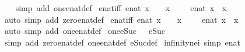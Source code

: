 \begin{isabellebody}
%
\isadelimproof
\ \ %
\endisadelimproof
%
\isatagproof
{}\isamarkupfalse%
\ {\isacharparenleft}simp\ add{\isacharcolon}\ one{\isacharunderscore}enat{\isacharunderscore}def{\isacharparenright}%
\endisatagproof
{\isafoldproof}%
%
\isadelimproof
\isanewline
%
\endisadelimproof
\isanewline
{}\isamarkupfalse%
\ enat{\isacharunderscore}{}{\isacharunderscore}iff{\isacharcolon}\ {\isachardoublequoteopen}enat\ x\ {\isacharequal}\ {}\ {\isasymlongleftrightarrow}\ x\ {\isacharequal}\ {}{\isachardoublequoteclose}\ {\isachardoublequoteopen}{}\ {\isacharequal}\ enat\ x\ {\isasymlongleftrightarrow}\ x\ {\isacharequal}\ {}{\isachardoublequoteclose}\isanewline
%
\isadelimproof
\ \ %
\endisadelimproof
%
\isatagproof
{}\isamarkupfalse%
\ {\isacharparenleft}auto\ simp\ add{\isacharcolon}\ zero{\isacharunderscore}enat{\isacharunderscore}def{\isacharparenright}%
\endisatagproof
{\isafoldproof}%
%
\isadelimproof
\isanewline
%
\endisadelimproof
\isanewline
{}\isamarkupfalse%
\ enat{\isacharunderscore}{}{\isacharunderscore}iff{\isacharcolon}\ {\isachardoublequoteopen}enat\ x\ {\isacharequal}\ {}\ {\isasymlongleftrightarrow}\ x\ {\isacharequal}\ {}{\isachardoublequoteclose}\ {\isachardoublequoteopen}{}\ {\isacharequal}\ enat\ x\ {\isasymlongleftrightarrow}\ x\ {\isacharequal}\ {}{\isachardoublequoteclose}\isanewline
%
\isadelimproof
\ \ %
\endisadelimproof
%
\isatagproof
{}\isamarkupfalse%
\ {\isacharparenleft}auto\ simp\ add{\isacharcolon}\ one{\isacharunderscore}enat{\isacharunderscore}def{\isacharparenright}%
\endisatagproof
{\isafoldproof}%
%
\isadelimproof
\isanewline
%
\endisadelimproof
\isanewline
{}\isamarkupfalse%
\ one{\isacharunderscore}eSuc{\isacharcolon}\ {\isachardoublequoteopen}{}\ {\isacharequal}\ eSuc\ {}{\isachardoublequoteclose}\isanewline
%
\isadelimproof
\ \ %
\endisadelimproof
%
\isatagproof
{}\isamarkupfalse%
\ {\isacharparenleft}simp\ add{\isacharcolon}\ zero{\isacharunderscore}enat{\isacharunderscore}def\ one{\isacharunderscore}enat{\isacharunderscore}def\ eSuc{\isacharunderscore}def{\isacharparenright}%
\endisatagproof
{\isafoldproof}%
%
\isadelimproof
\isanewline
%
\endisadelimproof
\isanewline
{}\isamarkupfalse%
\ infinity{\isacharunderscore}ne{\isacharunderscore}i{}\ {\isacharbrackleft}simp{\isacharbrackright}{\isacharcolon}\ {\isachardoublequoteopen}{\isacharparenleft}{\isasyminfinity}{\isacharcolon}{\isacharcolon}enat{\isacharparenright}\ {\isasymnoteq}\ {}{\isachardoublequoteclose}\isanewline

\end{isabellebody}
